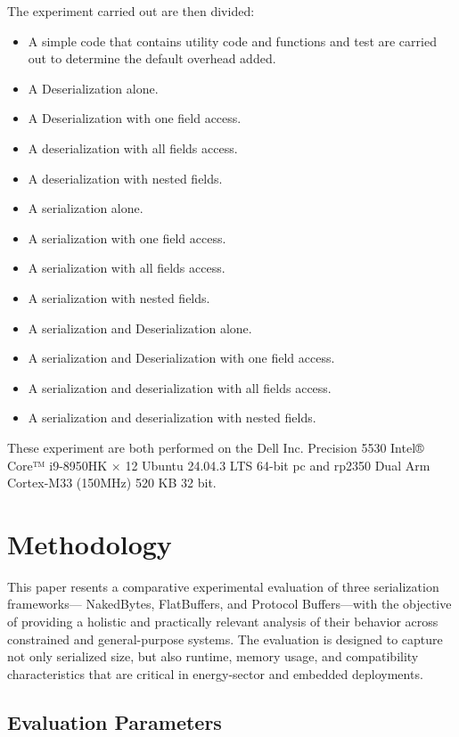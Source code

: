 \documentclass[11pt, a4paper]{article}
\begin{document}
The experiment carried out are then divided:
\begin{itemize}
    \item A simple code that contains utility code and functions and test are carried out to determine the default overhead added.
    \item A Deserialization alone.
    \item A Deserialization with one field access.
    \item A deserialization with all fields access.
    \item A deserialization with nested fields.
    \item A serialization alone.
    \item A serialization with one field access.
    \item A serialization with all fields access.
    \item A serialization with nested fields.
    \item A serialization and Deserialization alone.
    \item A serialization and Deserialization with one field access.
    \item A serialization and deserialization with all fields access.
    \item A serialization and deserialization with nested fields.
\end{itemize}

These experiment are both performed on the Dell Inc. Precision 5530 Intel® Core™ i9-8950HK × 12 Ubuntu 24.04.3 LTS 64-bit pc and rp2350  Dual Arm Cortex-M33 (150MHz)  520 KB 32 bit.


\section{Methodology}

This paper resents a comparative experimental evaluation of three serialization frameworks— NakedBytes, FlatBuffers, and Protocol Buffers—with the objective of providing a holistic and practically relevant analysis of their behavior across constrained and general-purpose systems. The evaluation is designed to capture not only serialized size, but also runtime, memory usage, and compatibility characteristics that are critical in energy-sector and embedded deployments.

\subsection{Evaluation Parameters}
\end{document}
